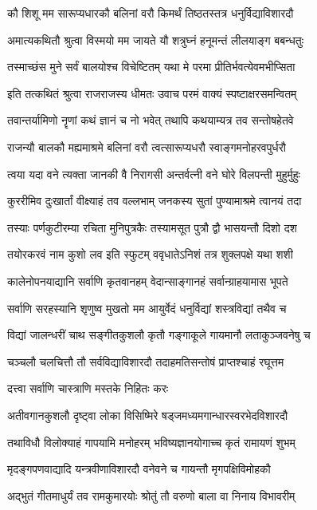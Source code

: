 \twolineshloka
{कौ शिशू मम सारूप्यधारकौ बलिनां वरौ}
{किमर्थं तिष्ठतस्तत्र धनुर्विद्याविशारदौ}%

\twolineshloka
{अमात्यकथितौ श्रुत्वा विस्मयो मम जायते}
{यौ शत्रुघ्नं हनूमन्तं लीलयाङ्ग बबन्धतुः}%

\twolineshloka
{तस्माच्छंस मुने सर्वं बालयोश्च विचेष्टितम्}
{यथा मे परमा प्रीतिर्भवत्येवमभीप्सिता}%

\twolineshloka
{इति तत्कथितं श्रुत्वा राजराजस्य धीमतः}
{उवाच परमं वाक्यं स्पष्टाक्षरसमन्वितम्}%


\twolineshloka
{तवान्तर्यामिणो नॄणां कथं ज्ञानं च नो भवेत्}
{तथापि कथयाम्यत्र तव सन्तोषहेतवे}%

\twolineshloka
{राजन्यौ बालकौ मह्यमाश्रमे बलिनां वरौ}
{त्वत्सारूप्यधरौ स्वाङ्गमनोहरवपुर्धरौ}%

\twolineshloka
{त्वया यदा वने त्यक्ता जानकी वै निरागसी}
{अन्तर्वत्नी वने घोरे विलपन्ती मुहुर्मुहुः}%

\twolineshloka
{कुररीमिव दुःखार्तां वीक्ष्याहं तव वल्लभाम्}
{जनकस्य सुतां पुण्यामाश्रमे त्वानयं तदा}%

\twolineshloka
{तस्याः पर्णकुटीरम्या रचिता मुनिपुत्रकैः}
{तस्यामसूत पुत्रौ द्वौ भासयन्तौ दिशो दश}%

\twolineshloka
{तयोरकरवं नाम कुशो लव इति स्फुटम्}
{ववृधातेऽनिशं तत्र शुक्लपक्षे यथा शशी}%

\twolineshloka
{कालेनोपनयाद्यानि सर्वाणि कृतवानहम्}
{वेदान्साङ्गानहं सर्वान्ग्राहयामास भूपते}%

\twolineshloka
{सर्वाणि सरहस्यानि शृणुष्व मुखतो मम}
{आयुर्वेदं धनुर्विद्यां शस्त्रविद्यां तथैव च}%

\twolineshloka
{विद्यां जालन्धरीं चाथ सङ्गीतकुशलौ कृतौ}
{गङ्गाकूले गायमानौ लताकुञ्जवनेषु च}%

\twolineshloka
{चञ्चलौ चलचित्तौ तौ सर्वविद्याविशारदौ}
{तदाहमतिसन्तोषं प्राप्तश्चाहं रघूत्तम}%

दत्त्वा सर्वाणि चास्त्राणि मस्तके निहितः करः

\twolineshloka
{अतीवगानकुशलौ दृष्ट्वा लोका विसिष्मिरे}
{षड्जमध्यमगान्धारस्वरभेदविशारदौ}%

\twolineshloka
{तथाविधौ विलोक्याहं गापयामि मनोहरम्}
{भविष्यज्ञानयोगाच्च कृतं रामायणं शुभम्}%

\twolineshloka
{मृदङ्गपणवाद्यादि यन्त्रवीणाविशारदौ}
{वनेवने च गायन्तौ मृगपक्षिविमोहकौ}%

\twolineshloka
{अद्भुतं गीतमाधुर्यं तव रामकुमारयोः}
{श्रोतुं तौ वरुणो बाला वा निनाय विभावरीम्}%

